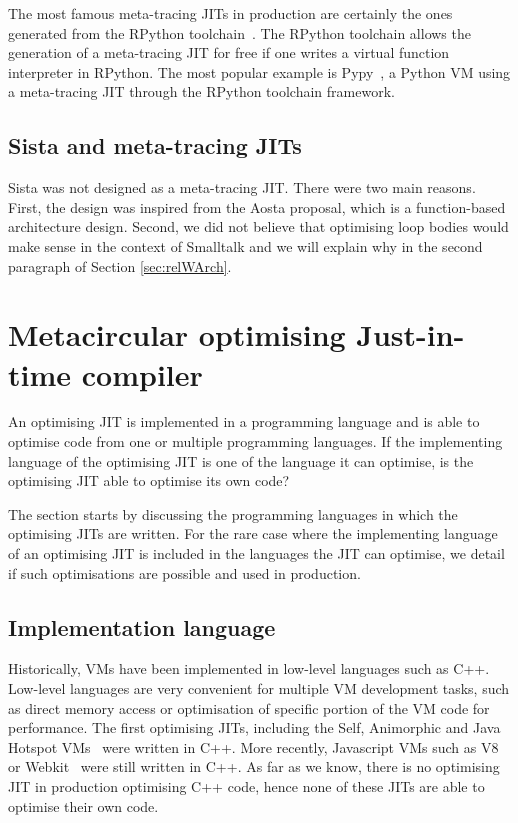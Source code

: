 \documentclass[a4paper,12pt,twoside]{../includes/ThesisStyle}
\begin{document}
The most famous meta-tracing JITs in production are certainly the ones generated from the RPython toolchain~\cite{Rigo06a}. The RPython toolchain allows the generation of a meta-tracing JIT for free if one writes a virtual function interpreter in RPython. The most popular example is Pypy~\cite{Rigo06a,PyPyTracing}, a Python VM using a meta-tracing JIT through the RPython toolchain framework.

\subsection{Sista and meta-tracing JITs}

Sista was not designed as a meta-tracing JIT. There were two main reasons. First, the design was inspired from the Aosta proposal, which is a function-based architecture design. Second, we did not believe that optimising loop bodies would make sense in the context of Smalltalk and we will explain why in the second paragraph of Section \ref{sec:relWArch}.


\section{Metacircular optimising Just-in-time compiler}
\label{sec:implLang}

An optimising JIT is implemented in a programming language and is able to optimise code from one or multiple programming languages. If the implementing language of the optimising JIT is one of the language it can optimise, is the optimising JIT able to optimise its own code?

The section starts by discussing the programming languages in which the optimising JITs are written. For the rare case where the implementing language of an optimising JIT is included in the languages the JIT can optimise, we detail if such optimisations are possible and used in production.

\subsection{Implementation language}
Historically, VMs have been implemented in low-level languages such as C++. Low-level languages are very convenient for multiple VM development tasks, such as direct memory access or optimisation of specific portion of the VM code for performance. The first optimising JITs, including the Self, Animorphic and Java Hotspot VMs~\cite{UrsPHD,Sun06} were written in C++. More recently, Javascript VMs such as V8 or Webkit~\cite{Webkit15} were still written in C++. As far as we know, there is no optimising JIT in production optimising C++ code, hence none of these JITs are able to optimise their own code.
\end{document}
